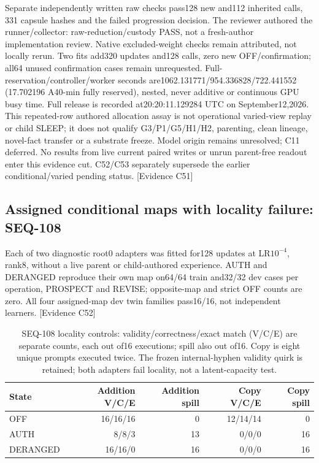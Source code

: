 \documentclass[11pt]{article}
\newcommand{\ev}[1]{\textsf{[Evidence #1]}}
\begin{document}
Separate independently written raw checks pass128 new and112 inherited calls,
331 capsule hashes and the failed progression decision. The reviewer authored
the runner/collector: raw-reduction/custody PASS, not a fresh-author implementation
review. Native excluded-weight checks remain attributed, not locally rerun.
Two fits add320 updates and128 calls, zero new OFF/confirmation; all64 unused
confirmation cases remain unrequested. Full-reservation/controller/worker
seconds are1062.131771/954.336828/722.441552 (17.702196 A40-min fully reserved),
nested, never additive or continuous GPU busy time. Full release is recorded
at20:20:11.129284 UTC on September12,2026. This repeated-row authored allocation
assay is not operational varied-view replay or child SLEEP; it does not qualify
G3/P1/G5/H1/H2, parenting, clean lineage, novel-fact transfer or a substrate
freeze. Model origin remains unresolved; C11 deferred. No results from live
current paired writes or unrun parent-free readout enter this evidence cut.
C52/C53 separately supersede the earlier conditional/varied pending status. \ev{C51}

\subsection{Assigned conditional maps with locality failure: SEQ-108}
Each of two diagnostic root0 adapters was fitted for128 updates at LR$10^{-4}$,
rank8, without a live parent or child-authored experience. AUTH and DERANGED
reproduce their own map on64/64 train and32/32 dev cases per operation,
PROSPECT and REVISE; opposite-map and strict OFF counts are zero. All four
assigned-map dev twin families pass16/16, not independent learners. \ev{C52}

\begin{table}[ht]
\centering\small
\begin{tabular}{lrrrr}
\toprule
State & Addition V/C/E & Addition spill & Copy V/C/E & Copy spill \\
\midrule
OFF & 16/16/16 & 0 & 12/14/14 & 0 \\
AUTH & 8/8/3 & 13 & 0/0/0 & 16 \\
DERANGED & 16/16/0 & 16 & 0/0/0 & 16 \\
\bottomrule
\end{tabular}
\caption{SEQ-108 locality controls: validity/correctness/exact match (V/C/E)
are separate counts, each out of16 executions; spill also out of16. Copy is
eight unique prompts executed twice. The frozen internal-hyphen validity quirk
is retained; both adapters fail locality, not a latent-capacity test.}
\label{tab:seq108-locality}
\end{table}
\end{document}
